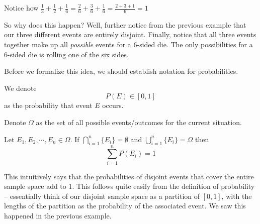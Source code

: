 \documentclass[main.tex]{subfiles}
\begin{document}

\begin{rem}
	Notice how \(\frac{1}{3} + \frac{1}{2} + \frac{1}{6} = \frac{2}{6} + \frac{3}{6} + \frac{1}{6} = \frac{2+3+1}{6} = 1\)
\end{rem}

So why does this happen? Well, further notice from the previous example that our three different events are entirely disjoint. Finally, notice that all three events together make up all \textit{possible} events for a 6-sided die. The only possibilities for a 6-sided die is rolling one of the six sides.

Before we formalize this idea, we should establish notation for probabilities.

\begin{defn}
	We denote \[P(E) \in [0,1]\] as the probability that event \(E\) occurs.
\end{defn}

\begin{defn}
	Denote \(\Omega\) as the set of all possible events/outcomes for the current situation.
\end{defn}

\begin{thm}
	Let \(E_1,E_2,\cdots,E_n \in \Omega\). If \(\bigcap_{i=1}^{n} \{E_i\} = \emptyset\) and \(\bigcup_{i=1}^{n} \{E_i\} = \Omega\) then \[\sum_{i=1}^{n} P(E_i) = 1\]
\end{thm}

This intuitively says that the probabilities of disjoint events that cover the entire sample space add to 1. This follows quite easily from the definition of probability -- essentially think of our disjoint sample space as a partition of \([0,1]\), with the lengths of the partition as the probability of the associated event. We saw this happened in the previous example.

\end{document}
